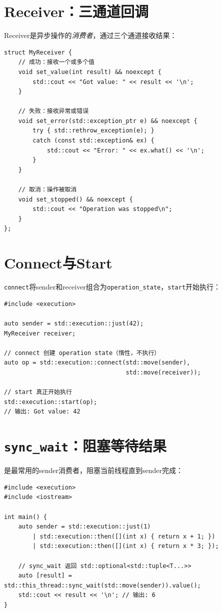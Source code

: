 \documentclass[12pt,a4paper,fontset=fandol]{ctexbook}
\begin{document}
\section{Receiver：三通道回调}

Receiver是异步操作的\emph{消费者}，通过三个通道接收结果：

\begin{lstlisting}
struct MyReceiver {
    // 成功：接收一个或多个值
    void set_value(int result) && noexcept {
        std::cout << "Got value: " << result << '\n';
    }

    // 失败：接收异常或错误
    void set_error(std::exception_ptr e) && noexcept {
        try { std::rethrow_exception(e); }
        catch (const std::exception& ex) {
            std::cout << "Error: " << ex.what() << '\n';
        }
    }

    // 取消：操作被取消
    void set_stopped() && noexcept {
        std::cout << "Operation was stopped\n";
    }
};
\end{lstlisting}

\section{Connect与Start}

\texttt{connect}将sender和receiver组合为\texttt{operation\_state}，\texttt{start}开始执行：

\begin{lstlisting}
#include <execution>

auto sender = std::execution::just(42);
MyReceiver receiver;

// connect 创建 operation state（惰性，不执行）
auto op = std::execution::connect(std::move(sender),
                                  std::move(receiver));

// start 真正开始执行
std::execution::start(op);
// 输出: Got value: 42
\end{lstlisting}

\section{\texttt{sync\_wait}：阻塞等待结果}

\texttt{}是最常用的sender消费者，阻塞当前线程直到sender完成：

\begin{lstlisting}
#include <execution>
#include <iostream>

int main() {
    auto sender = std::execution::just(1)
        | std::execution::then([](int x) { return x + 1; })
        | std::execution::then([](int x) { return x * 3; });

    // sync_wait 返回 std::optional<std::tuple<T...>>
    auto [result] = std::this_thread::sync_wait(std::move(sender)).value();
    std::cout << result << '\n'; // 输出: 6
}
\end{lstlisting}
\end{document}
